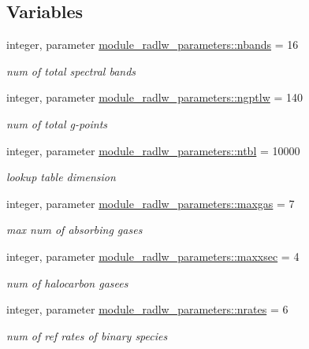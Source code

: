\subsection*{Variables}
\begin{DoxyCompactItemize}
\item 
integer, parameter \hyperlink{namespacemodule__radlw__parameters_a48e11b992a80595d71c92f7c9bfbe19c}{module\+\_\+radlw\+\_\+parameters\+::nbands} = 16
\begin{DoxyCompactList}\small\item\em num of total spectral bands \end{DoxyCompactList}\item 
integer, parameter \hyperlink{namespacemodule__radlw__parameters_a05fe17fe932ce62a3ae2c6c564584321}{module\+\_\+radlw\+\_\+parameters\+::ngptlw} = 140
\begin{DoxyCompactList}\small\item\em num of total g-\/points \end{DoxyCompactList}\item 
integer, parameter \hyperlink{namespacemodule__radlw__parameters_a61ae33b9db5bac9962f72e2a0db3c0e4}{module\+\_\+radlw\+\_\+parameters\+::ntbl} = 10000
\begin{DoxyCompactList}\small\item\em lookup table dimension \end{DoxyCompactList}\item 
integer, parameter \hyperlink{namespacemodule__radlw__parameters_a01330b4ad09907f2db51cb516ed21033}{module\+\_\+radlw\+\_\+parameters\+::maxgas} = 7
\begin{DoxyCompactList}\small\item\em max num of absorbing gases \end{DoxyCompactList}\item 
integer, parameter \hyperlink{namespacemodule__radlw__parameters_a5817221936731c6ee6443da6a64e934e}{module\+\_\+radlw\+\_\+parameters\+::maxxsec} = 4
\begin{DoxyCompactList}\small\item\em num of halocarbon gasees \end{DoxyCompactList}\item 
integer, parameter \hyperlink{namespacemodule__radlw__parameters_a86288e4bbe3d6962505488790ff42bfa}{module\+\_\+radlw\+\_\+parameters\+::nrates} = 6
\begin{DoxyCompactList}\small\item\em num of ref rates of binary species \end{DoxyCompactList}\item 

\end{DoxyCompactItemize}
